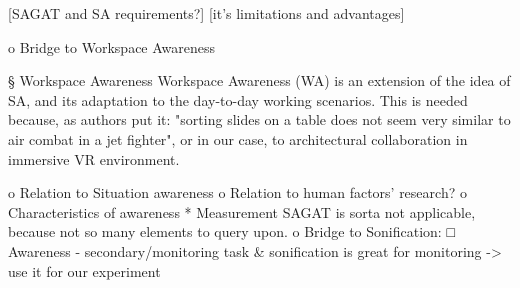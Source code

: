 [SAGAT and SA requirements?]
[it's limitations and advantages]

o Bridge to Workspace Awareness

§ Workspace Awareness 
Workspace Awareness (WA) is an extension of the idea of SA, and its adaptation to the day-to-day working scenarios. This is needed because, as authors put it: "sorting slides on a table does not seem very similar to air combat in a jet fighter", or in our case, to architectural collaboration in immersive VR environment.

o Relation to Situation awareness
o Relation to human factors’ research?
o Characteristics of awareness
* Measurement
SAGAT is sorta not applicable, because not so many elements to query upon.
o Bridge to Sonification: 
□ Awareness - secondary/monitoring task & sonification is great for monitoring -> use it for our experiment 

